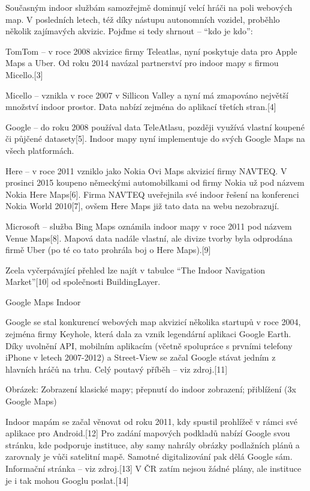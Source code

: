 Současným indoor službám samozřejmě dominují velcí hráči na poli webových map. V posledních letech, též díky nástupu autonomních vozidel, proběhlo několik zajímavých akvizic. Pojďme si tedy shrnout – “kdo je kdo”:

TomTom – v roce 2008 akvizice firmy Teleatlas, nyní poskytuje data pro Apple Maps a Uber. Od roku 2014 navázal partnerství pro indoor mapy s firmou Micello.[3] 

Micello – vznikla v roce 2007 v Sillicon Valley a nyní má zmapováno největší množství indoor prostor. Data nabízí zejména do aplikací třetích stran.[4]

Google – do roku 2008 používal data TeleAtlasu, později využívá vlastní koupené či půjčené datasety[5]. Indoor mapy nyní implementuje do svých Google Maps na všech platformách.

Here – v roce 2011 vzniklo jako Nokia Ovi Maps akvizicí firmy NAVTEQ. V prosinci 2015 koupeno německými automobilkami od firmy Nokia už pod názvem Nokia Here Maps[6]. Firma NAVTEQ uveřejnila své indoor řešení na konferenci Nokia World 2010[7], ovšem Here Maps již tato data na webu nezobrazují.

Microsoft – služba Bing Maps oznámila indoor mapy v roce 2011 pod názvem Venue Maps[8]. Mapová data nadále vlastní, ale divize tvorby byla odprodána firmě Uber (po té co tato prohrála boj o Here Maps).[9]

Zcela vyčerpávající přehled lze najít v tabulce “The Indoor Navigation Market”[10] od společnosti BuildingLayer.

Google Maps Indoor



Google se stal konkurencí webových map akvizicí několika startupů v roce 2004, zejména firmy Keyhole, která dala za vznik legendární aplikaci Google Earth. Díky uvolnění API, mobilním aplikacím (včetně spolupráce s prvními telefony iPhone v letech 2007-2012) a Street-View se začal Google stávat jedním z hlavních hráčů na trhu. Celý poutavý příběh – viz zdroj.[11]



Obrázek: Zobrazení klasické mapy; přepnutí do indoor zobrazení; přiblížení (3x Google Maps)

Indoor mapám se začal věnovat od roku 2011, kdy spustil prohlížeč v rámci své aplikace pro Android.[12] Pro zadání mapových podkladů nabízí Google svou stránku, kde podporuje instituce, aby samy nahrály obrázky podlažních plánů a zarovnaly je vůči satelitní mapě. Samotné digitalizování pak dělá Google sám. Informační stránka – viz zdroj.[13] V ČR zatím nejsou žádné plány, ale instituce je i tak mohou Googlu poslat.[14]

